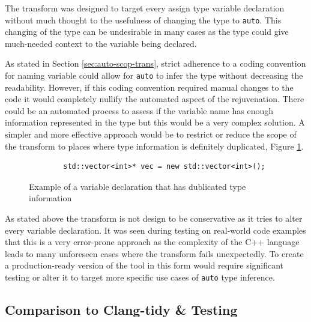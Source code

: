 \documentclass[bsc,frontabs,singlespacing,twoside,parskip,deptreport]{infthesis}
\begin{document}

The transform was designed to target every assign type variable declaration without much thought to the usefulness of changing the type to \texttt{auto}. This changing of the type can be undesirable in many cases as the type could give much-needed context to the variable being declared. 

As stated in Section \ref{sec:auto-scop-trans}, strict adherence to a coding convention for naming variable could allow for \texttt{auto} to infer the type without decreasing the readability. However, if this coding convention required manual changes to the code it would completely nullify the automated aspect of the rejuvenation. There could be an automated process to assess if the variable name has enough information represented in the type but this would be a very complex solution. A simpler and more effective approach would be to restrict or reduce the scope of the transform to places where type information is definitely duplicated, Figure \ref{fig:example-dup-typ-info}.

\begin{figure}
    \centering
    \begin{verbatim}
        std::vector<int>* vec = new std::vector<int>(); 
    \end{verbatim}
    \caption{Example of a variable declaration that has dublicated type information}
    \label{fig:example-dup-typ-info}
\end{figure}


As stated above the transform is not design to be conservative as it tries to alter every variable declaration. It was seen during testing on real-world code examples that this is a very error-prone approach as the complexity of the C++ language leads to many unforeseen cases where the transform fails unexpectedly. To create a production-ready version of the tool in this form would require significant testing or alter it to target more specific use cases of \texttt{auto} type inference.

\subsection{Comparison to Clang-tidy \& Testing }\label{sec:cmp-auto-reju-mod-auto}
\end{document}
